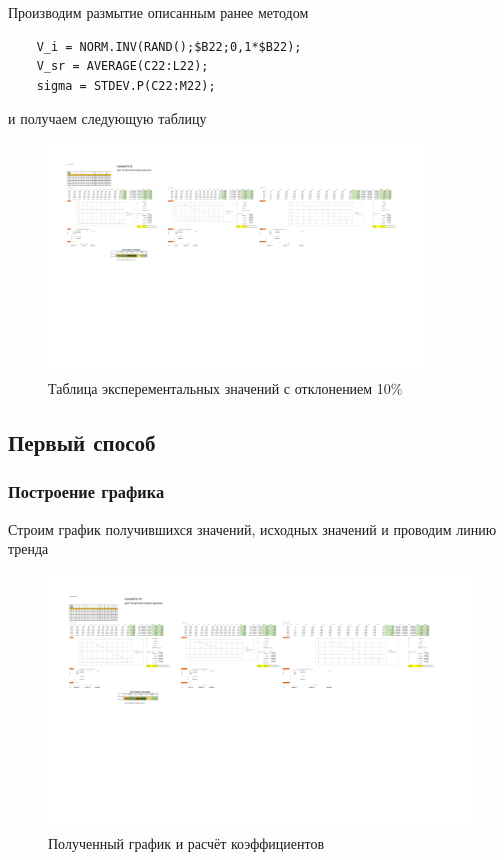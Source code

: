 \documentclass[14pt,a4paper]{extarticle}
\begin{document}
Производим размытие описанным ранее методом 
\begin{lstlisting}
	V_i = NORM.INV(RAND();$B22;0,1*$B22);
	V_sr = AVERAGE(C22:L22);
	sigma = STDEV.P(C22:M22);
\end{lstlisting}
и получаем следующую таблицу
\begin{figure}[H]
	\centering
	\includegraphics[trim=60 460 762 120, clip, width=0.9\textwidth]{results.pdf}\caption{Таблица эксперементальных значений с отклонением 10\%}\label{fig:razmito10}
\end{figure}
\subsection{Первый способ}
\subsubsection{Построение графика}
Строим график получившихся значений, исходных значений и проводим линию тренда
\begin{figure}[H]
	\centering
	\includegraphics[trim=70 385 716 150, clip, width=\textwidth]{results.pdf}\caption{Полученный график и расчёт коэффициентов}\label{fig:graph10}
\end{figure}
\end{document}
